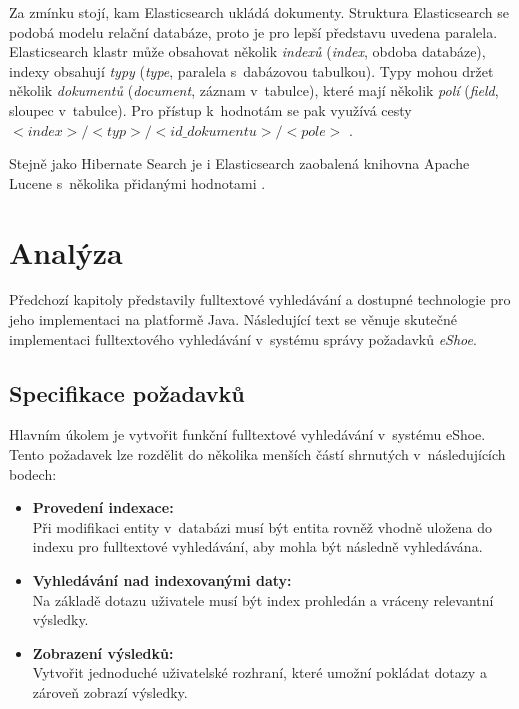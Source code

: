 \documentclass[11pt,oneside]{fithesis2}
\begin{document}
Za zmínku stojí, kam Elasticsearch ukládá dokumenty. Struktura Elasticsearch se podobá modelu relační databáze, proto je pro lepší představu uvedena paralela. Elasticsearch klastr může obsahovat několik \emph{indexů} (\emph{index}, obdoba databáze), indexy obsahují \emph{typy} (\emph{type}, paralela s~dabázovou tabulkou). Typy mohou držet několik \emph{dokumentů} (\emph{document}, záznam v~tabulce), které mají několik \emph{polí} (\emph{field}, sloupec v~tabulce). Pro přístup k~hodnotám se pak využívá cesty $<index>/<typ>/<id\_dokumentu>/<pole>$ \cite{ElasticsearchDefinitiveGuide}.

Stejně jako Hibernate Search je i Elasticsearch zaobalená knihovna Apache Lucene s~několika přidanými hodnotami \cite{ElasticsearchDefinitiveGuide}. 

\chapter{Analýza}
Předchozí kapitoly představily fulltextové vyhledávání a dostupné technologie pro jeho implementaci na platformě Java. Následující text se věnuje skutečné implementaci fulltextového vyhledávání v~systému správy požadavků \emph{eShoe}. 


\section{Specifikace požadavků}
\label{SpecifikacePozadavku}
Hlavním úkolem je vytvořit funkční fulltextové vyhledávání v~systému eShoe. Tento požadavek lze rozdělit do několika menších částí shrnutých v~následujících bodech:
\begin{itemize}
	\item \textbf{Provedení indexace:} \\ 
		 Při modifikaci entity v~databázi musí být entita rovněž vhodně uložena do indexu pro fulltextové vyhledávání, aby mohla být následně vyhledávána.

	\item \textbf{Vyhledávání nad indexovanými daty:} \\
		Na základě dotazu uživatele musí být index prohledán a vráceny relevantní výsledky.

	\item \textbf{Zobrazení výsledků:} \\
		Vytvořit jednoduché uživatelské rozhraní, které umožní pokládat dotazy a zároveň zobrazí výsledky.		
\end{itemize}
\end{document}
